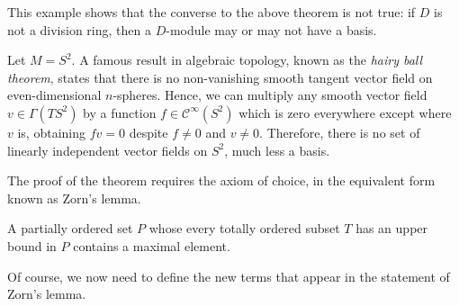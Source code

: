 This example shows that the converse to the above theorem is not true: if $D$ is not a division ring, then a $D$-module may or may not have a basis.

\item Let $M=S^2$. A famous result in algebraic topology, known as the \emph{hairy ball theorem}, states that there is no non-vanishing smooth tangent vector field on even-dimensional $n$-spheres. Hence, we can multiply any smooth vector field $v\in\Gamma(TS^2)$ by a function $f\in \mathcal{C}^\infty(S^2)$ which is zero everywhere except where $v$ is, obtaining $fv=0$ despite $f\neq 0$ and $v\neq 0$. Therefore, there is no set of linearly independent vector fields on $S^2$, much less a basis.
\een
\ee

The proof of the theorem requires the axiom of choice, in the equivalent form known as Zorn's lemma.

\bl[Zorn]
A partially ordered set $P$ whose every totally ordered subset $T$ has an upper bound in $P$ contains a maximal element.
\el

Of course, we now need to define the new terms that appear in the statement of Zorn's lemma. 

